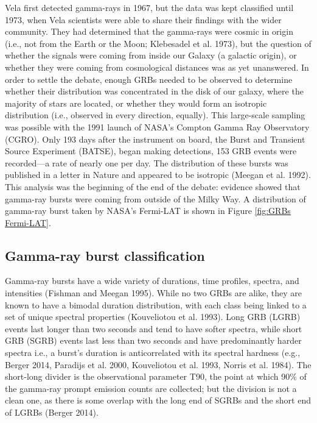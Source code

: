 \documentclass[1.5,11pt]{beavtex}
\begin{document}
Vela first detected gamma-rays in 1967, but the data was kept classified until 1973, when Vela scientists were able to share their findings with the wider community. They had determined that the gamma-rays were cosmic in origin (i.e., not from the Earth or the Moon; Klebesadel et al. 1973), but the question of whether the signals were coming from inside our Galaxy (a galactic origin), or whether they were coming from cosmological distances was as yet unanswered. In order to settle the debate, enough GRBs needed to be observed to determine whether their distribution was concentrated in the disk of our galaxy, where the majority of stars are located, or whether they would form an isotropic distribution (i.e., observed in every direction, equally). This large-scale sampling was possible with the 1991 launch of NASA's Compton Gamma Ray Observatory (CGRO).  Only 193 days after the instrument on board, the Burst and Transient Source Experiment (BATSE), began making detections, 153 GRB events were recorded---a rate of nearly one per day. The distribution of these bursts was published in a letter in Nature and appeared to be isotropic (Meegan et al. 1992). This analysis was the beginning of the end of the debate: evidence showed that gamma-ray bursts were coming from outside of the Milky Way. A distribution of gamma-ray burst taken by NASA's Fermi-LAT is shown in Figure \ref{fig:GRBs Fermi-LAT}.

\subsection{Gamma-ray burst classification}
\label{ch:Astro theory ssec:GRB class}

Gamma-ray bursts have a wide variety of durations, time profiles, spectra, and intensities (Fishman and Meegan 1995). While no two GRBs are alike, they are known to have a bimodal duration distribution, with each class being linked to a set of unique spectral properties (Kouveliotou et al. 1993). Long GRB (LGRB) events last longer than two seconds and tend to have softer spectra, while short GRB (SGRB) events last less than two seconds and have predominantly harder spectra i.e., a burst's duration is anticorrelated with its spectral hardness (e.g., Berger 2014, Paradijs et al. 2000, Kouveliotou et al. 1993, Norris et al. 1984). The short-long divider is the observational parameter T90, the point at which 90$\%$ of the gamma-ray prompt emission counts are collected; but the division is not a clean one, as there is some overlap with the long end of SGRBs and the short end of LGRBs (Berger 2014). 
\end{document}
